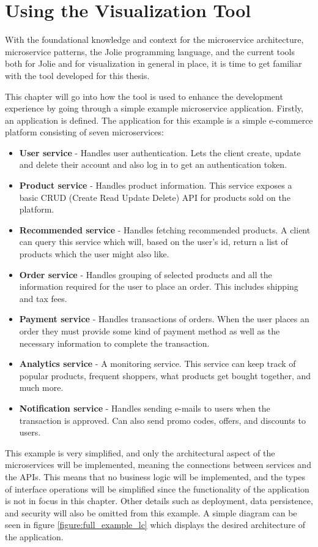 \chapter{Using the Visualization Tool}
With the foundational knowledge and context for the microservice architecture, microservice patterns, the Jolie programming language, and the current tools both for Jolie and for visualization in general in place, it is time to get familiar with the tool developed for this thesis.

This chapter will go into how the tool is used to enhance the development experience by going through a simple example microservice application.
Firstly, an application is defined. The application for this example is a simple e-commerce platform consisting of seven microservices:

\begin{itemize}
    \item \textbf{User service} - Handles user authentication. Lets the client create, update and delete their account and also log in to get an authentication token.
    \item \textbf{Product service} - Handles product information. This service exposes a basic CRUD (Create Read Update Delete) API for products sold on the platform.
    \item \textbf{Recommended service} - Handles fetching recommended products. A client can query this service which will, based on the user's id, return a list of products which the user might also like.
    \item \textbf{Order service} - Handles grouping of selected products and all the information required for the user to place an order. This includes shipping and tax fees.
    \item \textbf{Payment service} - Handles transactions of orders. When the user places an order they must provide some kind of payment method as well as the necessary information to complete the transaction.
    \item \textbf{Analytics service} - A monitoring service. This service can keep track of popular products, frequent shoppers, what products get bought together, and much more.
    \item \textbf{Notification service} - Handles sending e-mails to users when the transaction is approved. Can also send promo codes, offers, and discounts to users.
\end{itemize}
This example is very simplified, and only the architectural aspect of the microservices will be implemented, meaning the connections between services and the APIs. This means that no business logic will be implemented, and
the types of interface operations will be simplified since the functionality of the application is not in focus in this chapter.
Other details such as deployment, data persistence, and security will also be omitted from this example. A simple diagram can be seen in figure \ref*{figure:full_example_lc} which displays the desired architecture of the application.

